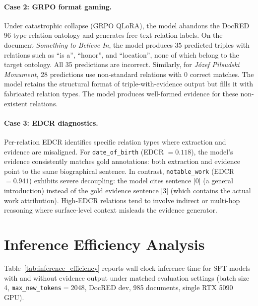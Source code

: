 \paragraph{Case 2: GRPO format gaming.}
Under catastrophic collapse (GRPO QLoRA), the model abandons the DocRED 96-type relation ontology and generates free-text relation labels. On the document \emph{Something to Believe In}, the model produces 35 predicted triples with relations such as ``is a'', ``honor'', and ``location'', none of which belong to the target ontology. All 35 predictions are incorrect. Similarly, for \emph{J\'{o}zef Pi\l{}sudski Monument}, 28 predictions use non-standard relations with 0 correct matches. The model retains the structural format of triple-with-evidence output but fills it with fabricated relation types. The model produces well-formed evidence for these non-existent relations.

\paragraph{Case 3: EDCR diagnostics.}
Per-relation EDCR identifies specific relation types where extraction and evidence are misaligned. For \texttt{date\_of\_birth} (EDCR $= 0.118$), the model's evidence consistently matches gold annotations: both extraction and evidence point to the same biographical sentence. In contrast, \texttt{notable\_work} (EDCR $= 0.941$) exhibits severe decoupling: the model cites sentence [0] (a general introduction) instead of the gold evidence sentence [3] (which contains the actual work attribution). High-EDCR relations tend to involve indirect or multi-hop reasoning where surface-level context misleads the evidence generator.


\section{Inference Efficiency Analysis}
\label{sec:inference_efficiency}

Table~\ref{tab:inference_efficiency} reports wall-clock inference time for SFT models with and without evidence output under matched evaluation settings (batch size 4, \texttt{max\_new\_tokens}$=$2048, DocRED dev, 985 documents, single RTX 5090 GPU).

